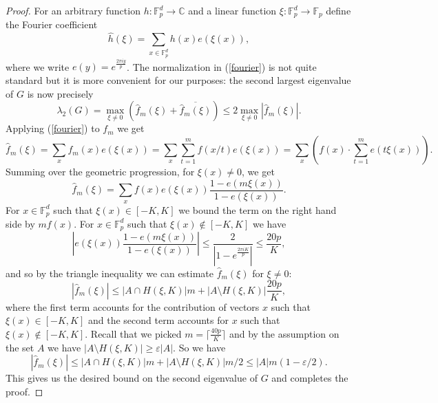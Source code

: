 \documentclass{daj}
\renewcommand{\le}{\leqslant}
\renewcommand{\ge}{\geqslant}
\newcommand{\C}{{\mathbb C}}
\newcommand{\FF}{\mathbb F}
\theoremstyle{definition}
\theoremstyle{remark}
\theoremstyle{definition}
\theoremstyle{definition}
\begin{document}
\begin{proof}
For an arbitrary function $h: \FF_p^d \rightarrow \C$ and a linear function $\xi: \FF_p^d \rightarrow \FF_p$ define the Fourier coefficient 
\begin{equation}\label{fourier}
    \hat h(\xi) = \sum_{x \in \FF_p^d} h(x) e(\xi(x)),    
\end{equation}
where we write $e(y) = e^{\frac{2\pi i y}{p}}$. The normalization in (\ref{fourier}) is not quite standard but it is more convenient for our purposes: the second largest eigenvalue of $G$ is now precisely 
$$
\lambda_2(G) = \max_{\xi \neq 0}\left( \hat f_m(\xi) + \overline{\hat f_m(\xi)}\right) \le 2 \max_{\xi \neq 0} |\hat f_m(\xi)|.
$$
Applying (\ref{fourier}) to $f_m$ we get
$$
\hat f_m(\xi) =  \sum_{x} f_m(x) e(\xi(x)) =\sum_{x} \sum_{t=1}^m f(x/t)  e(\xi(x)) = \sum_{x} \left( f(x) \cdot \sum_{t=1}^m e(t \xi(x))\right).
$$
Summing over the geometric progression, for $\xi(x) \neq 0$, we get
$$
\hat f_m(\xi) = \sum_{x} f(x) e(\xi(x)) \frac{1 -e(m \xi(x))}{1-e(\xi(x))}.
$$
For $x \in \FF_p^d$ such that $\xi(x) \in [-K, K]$ we bound the term on the right hand side by $m f(x)$. For $x \in \FF_p^d$ such that $\xi(x) \not \in [-K, K]$ we have
$$
\left |e(\xi(x)) \frac{1 -e(m \xi(x))}{1-e(\xi(x))}\right| \le \frac{2}{|1- e^{\frac{2\pi i K}{p}}|} \le \frac{20 p}{K},
$$
and so by the triangle inequality we can estimate $\hat f_m(\xi)$ for $\xi \neq 0$:
$$
|\hat f_m(\xi)| \le |A \cap H(\xi, K)| m + |A \setminus H(\xi, K)| \frac{20p}{K},
$$
where the first term accounts for the contribution of vectors $x$ such that $\xi(x) \in [-K, K]$ and the second term accounts for $x$ such that $\xi(x) \not \in [-K, K]$. Recall that we picked $m = \lceil\frac{40 p}{K}\rceil$ and by the assumption on the set $A$ we have $|A \setminus H(\xi, K)| \ge \varepsilon |A|$. So we have
$$
|\hat f_m(\xi)| \le |A \cap H(\xi, K)| m + |A \setminus H(\xi, K)| m/2 \le |A| m (1- \varepsilon/2).
$$
This gives us the desired bound on the second eigenvalue of $G$ and completes the proof.
\end{proof}
\end{document}
